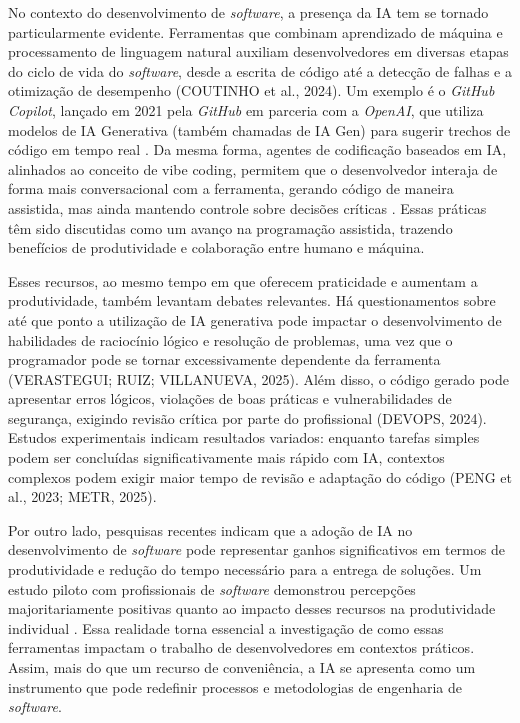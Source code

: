 \documentclass[english,brazilian]{UNISINOSartigo} %
\begin{document}
No contexto do desenvolvimento de \textit{software}, a presença da IA tem se tornado particularmente evidente. Ferramentas que combinam aprendizado de máquina e processamento de linguagem natural auxiliam desenvolvedores em diversas etapas do ciclo de vida do \textit{software}, desde a escrita de código até a detecção de falhas e a otimização de desempenho (COUTINHO et al., 2024). Um exemplo é o \textit{GitHub Copilot}, lançado em 2021 pela \textit{GitHub} em parceria com a \textit{OpenAI}, que utiliza modelos de IA Generativa (também chamadas de IA Gen) para sugerir trechos de código em tempo real \cite{github2021}. Da mesma forma, agentes de codificação baseados em IA, alinhados ao conceito de vibe coding, permitem que o desenvolvedor interaja de forma mais conversacional com a ferramenta, gerando código de maneira assistida, mas ainda mantendo controle sobre decisões críticas \cite{delaney2025}. Essas práticas têm sido discutidas como um avanço na programação assistida, trazendo benefícios de produtividade e colaboração entre humano e máquina.

Esses recursos, ao mesmo tempo em que oferecem praticidade e aumentam a produtividade, também levantam debates relevantes. Há questionamentos sobre até que ponto a utilização de IA generativa pode impactar o desenvolvimento de habilidades de raciocínio lógico e resolução de problemas, uma vez que o programador pode se tornar excessivamente dependente da ferramenta (VERASTEGUI; RUIZ; VILLANUEVA, 2025). Além disso, o código gerado pode apresentar erros lógicos, violações de boas práticas e vulnerabilidades de segurança, exigindo revisão crítica por parte do profissional (DEVOPS, 2024). Estudos experimentais indicam resultados variados: enquanto tarefas simples podem ser concluídas significativamente mais rápido com IA, contextos complexos podem exigir maior tempo de revisão e adaptação do código (PENG et al., 2023; METR, 2025).

Por outro lado, pesquisas recentes indicam que a adoção de IA no desenvolvimento de \textit{software} pode representar ganhos significativos em termos de produtividade e redução do tempo necessário para a entrega de soluções. Um estudo piloto com profissionais de \textit{software} demonstrou percepções majoritariamente positivas quanto ao impacto desses recursos na produtividade individual \cite{coutinho2024}. Essa realidade torna essencial a investigação de como essas ferramentas impactam o trabalho de desenvolvedores em contextos práticos. Assim, mais do que um recurso de conveniência, a IA se apresenta como um instrumento que pode redefinir processos e metodologias de engenharia de \textit{software}.
\end{document}
